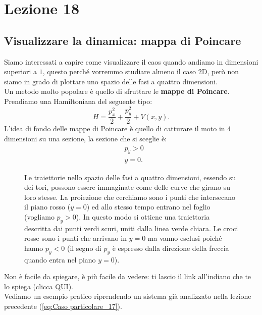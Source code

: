 \section{Lezione 18}%
\label{sub:Lezione 18}
\subsection{Visualizzare la dinamica: mappa di Poincare}%
\label{sub:Visualizzare la dinamica: mappa di Poincare}
Siamo interessati a capire come visualizzare il caos quando andiamo in dimensioni superiori a $1$, questo perché vorremmo studiare almeno il caso 2D, però non siamo in grado di plottare uno spazio delle fasi a quattro dimensioni. \\
Un metodo molto popolare è quello di sfruttare le \textbf{mappe di Poincare}.\\
Prendiamo una Hamiltoniana del seguente tipo:
\[
    H = \frac{p_x^2}{2}+\frac{p_y^2}{2} + V(x, y)
.\] 
L'idea di fondo delle mappe di Poincare è quello di catturare il moto in 4 dimensioni su una sezione, la sezione che si sceglie è:
\[\begin{aligned}
    & p_y>0\\
    & y=0
.\end{aligned}\]
\begin{figure}[H]
    \centering
    \caption{\scriptsize Le traiettorie nello spazio delle fasi a quattro dimensioni, essendo su dei tori, possono essere immaginate come delle curve che girano su loro stesse. La proiezione che cerchiamo sono i punti che intersecano il piano rosso ($y=0$) ed allo stesso tempo entrano nel foglio (vogliamo $p_y>0$). In questo modo si ottiene una traiettoria descritta dai punti verdi scuri, uniti dalla linea verde chiara. Le croci rosse sono i punti che arrivano in $y=0$ ma vanno esclusi poiché hanno $p_y<0$ (il segno di $p_y$ è espresso dalla direzione della freccia quando entra nel piano $y=0$).}
    \label{fig:18_flux_line}
\end{figure}
\noindent
Non è facile da spiegare, è più facile da vedere: ti lascio il link all'indiano che te lo spiega (clicca \href{https://www.youtube.com/watch?v=PR5Ds5iS3Ow}{QUI}).\\
Vediamo un esempio pratico riprendendo un sistema già analizzato nella lezione precedente (\ref{eq:Caso particolare_17}).
